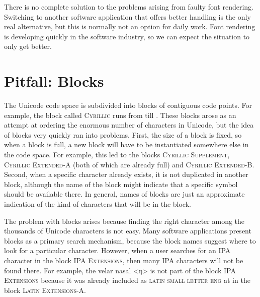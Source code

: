 There is no complete solution to the problems arising from faulty font rendering.
Switching to another software application that offers better handling is the
only real alternative, but this is normally not an option for daily work. 
Font rendering is developing quickly in the software industry, so we can expect 
the situation to only get better. %

\section{Pitfall: Blocks}
\label{pitfall-blocks}

The Unicode code space is subdivided into blocks of contiguous code points. For
example, the block called \textsc{Cyrillic} runs from  till
. These blocks arose as an attempt at ordering the enormous number of
characters in Unicode, but the idea of blocks very quickly ran into problems.
First, the size of a block is fixed, so when a block is full, a new block will
have to be instantiated somewhere else in the code space. For example, this
led to the blocks \textsc{Cyrillic Supplement}, \textsc{Cyrillic Extended-A}
(both of which are already full) and \textsc{Cyrillic Extended-B}. Second,
when a specific character already exists, it is not duplicated in another
block, although the name of the block might indicate that a specific symbol
should be available there. In general, names of blocks are just an approximate
indication of the kind of characters that will be in the block.

The problem with blocks arises because finding the right character among the
thousands of Unicode characters is not easy. Many software applications present
blocks as a primary search mechanism, because the block names suggest where to
look for a particular character. However, when a user searches for an IPA
character in the block \textsc{IPA Extensions}, then many IPA characters will not
be found there. For example, the velar nasal <ŋ> is not part of the block
\textsc{IPA Extensions} because it was already included as \textsc{latin small letter
eng} at  in the block \textsc{Latin Extensions-A}.

